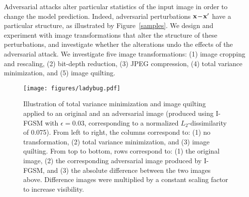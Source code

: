 



Adversarial attacks alter particular statistics of the input image in order to change the model prediction. Indeed, adversarial perturbations $\mathbf{x} \!-\! \mathbf{x}'$ have a particular structure, as illustrated by Figure~\ref{samples}. We design and experiment with image transformations that alter the structure of these perturbations, and investigate whether the alterations undo the effects of the adversarial attack. We investigate five image transformations: (1) image cropping and rescaling, (2) bit-depth reduction, (3) JPEG compression, (4) total variance minimization, and (5) image quilting.

\begin{wrapfigure}{r}{0.5\textwidth}
    \vspace{-2em}
    \texttt{[image: figures/ladybug.pdf]}
    \caption{Illustration of total variance minimization and image quilting applied to an original and an adversarial image (produced using I-FGSM with $\epsilon \!=\! 0.03$, corresponding to a normalized $L_2$-dissimilarity of 0.075). From left to right, the columns correspond to: (1) no transformation, (2) total variance minimization, and (3) image quilting. From top to bottom, rows correspond to: (1) the original image, (2) the corresponding adversarial image produced by I-FGSM, and (3) the absolute difference between the two images above. Difference images were multiplied by a constant scaling factor to increase visibility.}
    \label{ladybug}
    \vspace{-2em}
\end{wrapfigure}

